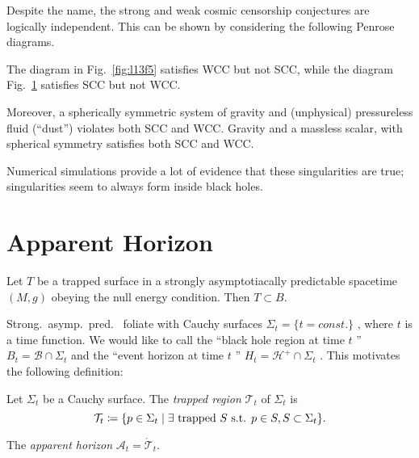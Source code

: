 Despite the name, the strong and weak cosmic censorship conjectures are logically independent.
This can be shown by considering the following Penrose diagrams.
\begin{figure}[tbhp]
  \centering
  \begin{minipage}[t]{0.5\columnwidth}
    \centering
    \def\svgwidth{0.8\columnwidth}
    
    \caption{}
    \label{fig:l13f5}
  \end{minipage}%
  \begin{minipage}[t]{0.5\columnwidth}
    \centering
    \def\svgwidth{0.7\columnwidth}
    
    \caption{}
    \label{fig:l13f6}
  \end{minipage}
\end{figure}
The diagram in Fig.~\ref{fig:l13f5} satisfies WCC but not SCC, while the diagram Fig.~\ref{fig:l13f6} satisfies SCC but not WCC.

Moreover, a spherically symmetric system of gravity and (unphysical) pressureless fluid (``dust'') violates both SCC and WCC.
Gravity and a massless scalar, with spherical symmetry satisfies both SCC and WCC.

Numerical simulations provide a lot of evidence that these singularities are true; singularities seem to always form inside black holes.

\section{Apparent Horizon}%
\label{sec:apparent_horizon}

\begin{theorem}[]
  Let $T$ be a trapped surface in a strongly asymptotiacally predictable spacetime $(M, g)$ obeying the null energy condition. Then $T \subset B$.
\end{theorem}

Strong.~asymp.~pred.~ foliate with Cauchy surfaces $\Sigma_t = \{t = const.\}$ , where $t$  is a time function.
We would like to call the ``black hole region at time $t$ '' $B_t = \mathcal{B} \cap \Sigma_t$  and the ``event horizon at time $t$ '' $H_t = \mathcal{H}^+ \cap \Sigma_t$ .
This motivates the following definition:
\begin{definition}
  Let $\Sigma_t$ be a Cauchy surface. The \emph{trapped region} $\mathcal{T}_t$ of $\Sigma_t$ is
  \begin{equation}
    \mathcal{T}_t \coloneqq \{p \in \Sigma_t \suchthat \exists \text{ trapped } S \text{ s.t. } p \in S, S \subset \Sigma_t\}.
  \end{equation}
\end{definition}
\begin{definition}[]
  The \emph{apparent horizon} $\mathcal{A}_t = \dot{\mathcal{T}}_t$.
\end{definition}

